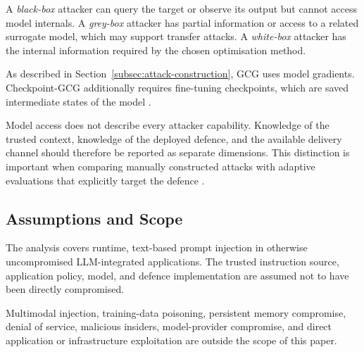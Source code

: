 A \emph{black-box} attacker can query the target or observe its output but
cannot access model internals. A \emph{grey-box} attacker has partial
information or access to a related surrogate model, which may support transfer
attacks. A \emph{white-box} attacker has the internal information required by
the chosen optimisation method.

As described in Section~\ref{subsec:attack-construction}, GCG uses model
gradients. Checkpoint-GCG additionally requires fine-tuning checkpoints, which
are saved intermediate states of the model
\parencites{zou2023universal}{yang2025checkpointgcg}.

Model access does not describe every attacker capability. Knowledge of the
trusted context, knowledge of the deployed defence, and the available delivery
channel should therefore be reported as separate dimensions. This distinction
is important when comparing manually constructed attacks with adaptive
evaluations that explicitly target the defence
\parencites{greshake2023indirect}
             {zou2023universal}
             {yang2025checkpointgcg}
             {pandya2025astra}.

\subsection{Assumptions and Scope}
\label{subsec:threat-scope}

The analysis covers runtime, text-based prompt injection in otherwise
uncompromised LLM-integrated applications. The trusted instruction source,
application policy, model, and defence implementation are assumed not to have
been directly compromised.

Multimodal injection, training-data poisoning, persistent memory compromise,
denial of service, malicious insiders, model-provider compromise, and direct
application or infrastructure exploitation are outside the scope of this paper.